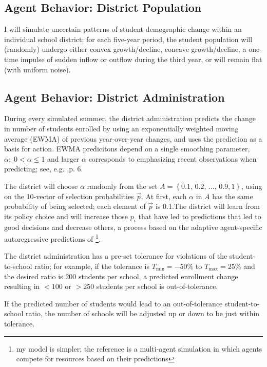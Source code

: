 \documentclass{article}
\begin{document}
\subsection*{Agent Behavior: District Population}
I will simulate uncertain patterns of student demographic change within an individual school district; for each five-year period, the student population will (randomly) undergo either convex growth/decline, concave growth/decline, a one-time impulse of sudden inflow or outflow during the third year, or will remain flat (with uniform noise).

\subsection*{Agent Behavior: District Administration}	
During every simulated summer, the district administration predicts the change in number of students enrolled by using an exponentially weighted moving average (EWMA) of previous year-over-year changes, and uses the prediction as a basis for action. EWMA predicitons depend on a single smoothing parameter, $\alpha;\; 0<\alpha\leq1$ and larger $\alpha$ corresponds to emphasizing recent observations when predicting; see, e.g.  \cite{snyder1999understanding},p. 6. 

The district will choose $\alpha$ randomly from the set $A = \left\{0.1,\,0.2,\,\dots,\,0.9, 1\right\}$, using on the 10-vector of selection probabilities $\vec{p}$. At first, each $\alpha$ in $A$ has the same probability of being selected; each element of $\vec{p}$ is 0.1.The district will learn from its policy choice and will increase those $p_i$ that have led to predictions that led to good decisions and decrease others, a process based on the adaptive agent-specific autoregressive predictions of \cite{fogel1999inductive}\footnote{my model is simpler; the reference is a multi-agent simulation in which agents compete for resources based on their predictions}.

The district administration has a pre-set tolerance for violations of the student-to-school ratio; for example, if the tolerance is $T_\text{min}=-50\%$ to $T_\text{max}=25\%$ and the desired ratio is 200 students per school, a predicted enrollment change resulting in $<100$ or $>250$ students per school is out-of-tolerance.


If the predicted number of students would lead to an out-of-tolerance student-to-school ratio, the number of schools will be adjusted up or down to be just within tolerance. 
\end{document}
